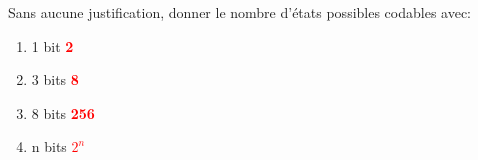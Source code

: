 \documentclass[a4paper,10pt]{report}
\def\ptsexoA{2}
\begin{document}
\renewcommand{\labelitemi}{\textbullet}

\pagestyle{DS_FP}          %
\NomPrenomNote{}


\exods{\ptsexoA}

Sans aucune justification, donner le nombre d'états possibles codables avec:

\begin{enumerate}[1)]
    \item 1 bit \dotfill{} \textcolor{red}{\textbf{2}}
    \item 3 bits \dotfill{} \textcolor{red}{\textbf{8}}
    \item 8 bits \dotfill{} \textcolor{red}{\textbf{256}}
    \item n bits \dotfill{} \textcolor{red}{\textbf{$2^n$}}
\end{enumerate}

\medskip
\end{document}
